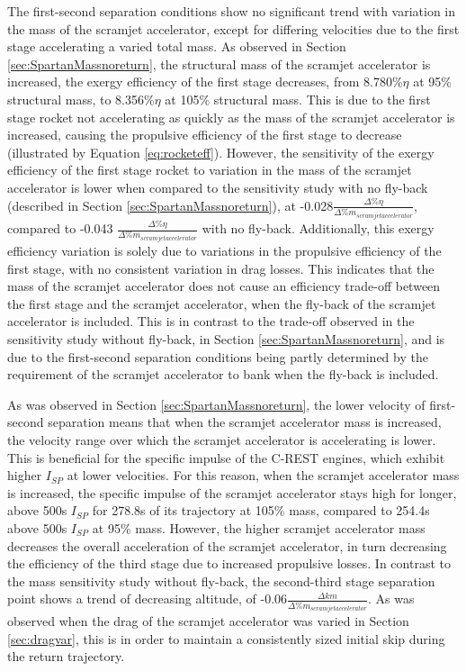 The first-second separation conditions show no significant trend with variation in the mass of the scramjet accelerator, except for differing velocities due to the first stage accelerating a varied total mass.
As observed in Section \ref{sec:SpartanMassnoreturn}, the structural mass of the scramjet accelerator is increased, the exergy efficiency of the first stage decreases, from 8.780\%$\eta$ at 95\% structural mass, to 8.356\%$\eta$ at 105\% structural mass. This is due to the first stage rocket not accelerating as quickly as the mass of the scramjet accelerator is increased, causing the propulsive efficiency of the first stage to decrease (illustrated by Equation \ref{eq:rocketeff}).
 However, the sensitivity of the exergy efficiency of the first stage rocket to variation in the mass of the scramjet accelerator is lower when compared to the sensitivity study with no fly-back (described in Section \ref{sec:SpartanMassnoreturn}), at -0.028$\frac{\Delta \%\eta}{\Delta\% m_{scramjet accelerator}}$, compared to -0.043 $\frac{\Delta \%\eta}{\Delta\% m_{scramjet accelerator}}$ with no fly-back. Additionally, this exergy efficiency variation is solely due to variations in the propulsive efficiency of the first stage, with no consistent variation in drag losses. This indicates that the mass of the scramjet accelerator does not cause an efficiency trade-off between the first stage and the scramjet accelerator, when the fly-back of the scramjet accelerator is included. This is in contrast to the trade-off observed in the sensitivity study without fly-back, in Section \ref{sec:SpartanMassnoreturn}, and is due to the first-second separation conditions being partly determined by the requirement of the scramjet accelerator to bank when the fly-back is included. 
 
 As was observed in Section \ref{sec:SpartanMassnoreturn}, the lower velocity of first-second separation means that when the scramjet accelerator mass is increased, the velocity range over which the scramjet accelerator is accelerating is lower. This is beneficial for the specific impulse of the C-REST engines, which exhibit higher $I_{SP}$ at lower velocities. For this reason, when the scramjet accelerator mass is increased, the specific impulse of the scramjet accelerator stays high for longer, above 500s $I_{SP}$ for 278.8s of its trajectory at 105\% mass, compared to 254.4s above 500s $I_{SP}$ at 95\% mass. 
However, the higher scramjet accelerator mass decreases the overall acceleration of the scramjet accelerator, in turn decreasing the efficiency of the third stage due to increased propulsive losses.
In contrast to the mass sensitivity study without fly-back, the second-third stage separation point shows a trend of decreasing altitude, of -0.06$\frac{\Delta km}{\Delta\% m_{scramjet accelerator}}$. As was observed when the drag of the scramjet accelerator was varied in Section \ref{sec:dragvar}, this is in order to maintain a consistently sized initial skip during the return trajectory.


